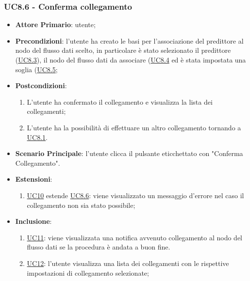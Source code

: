 	\subsubsection{UC8.6 - Conferma collegamento}
		\begin{itemize}
			\item\textbf{Attore Primario}: utente;
			\item\textbf{Precondizioni}: l’utente ha creato le basi per l'associazione del predittore al nodo del flusso dati scelto, in particolare è stato selezionato il predittore (\hyperref[par:UC8.3]{UC8.3}), il nodo del flusso dati da associare (\hyperref[par:UC8.4]{UC8.4} ed è stata impostata una soglia (\hyperref[par:UC8.5]{UC8.5};
			\item\textbf{Postcondizioni}: 
				\begin{enumerate}
					\item L’utente ha confermato il collegamento e visualizza la lista dei collegamenti;
					\item L'utente ha la possibilità di effettuare un altro collegamento tornando a \hyperref[par:UC8.1]{UC8.1}.
				\end{enumerate}

			\item\textbf{Scenario Principale}: l’utente clicca il pulsante eticchettato con "Conferma Collegamento".
			\item\textbf{Estensioni}:
				\begin{enumerate}
					\item\hyperref[par:UC10]{UC10} estende \hyperref[par:UC8.6]{UC8.6}: viene visualizzato un messaggio d’errore nel caso il collegamento non sia stato possibile;
				\end{enumerate}
			\item\textbf{Inclusione}: 
				\begin{enumerate}
					\item\hyperref[par:UC11]{UC11}: viene visualizzata una notifica avvenuto collegamento al nodo del flusso dati se la procedura è andata a buon fine.
					\item\hyperref[par:UC12]{UC12}:  l'utente visualizza una lista dei collegamenti con le rispettive impostazioni di collegamento selezionate;
				\end{enumerate}
		\end{itemize}


		\label{par:UC9}
